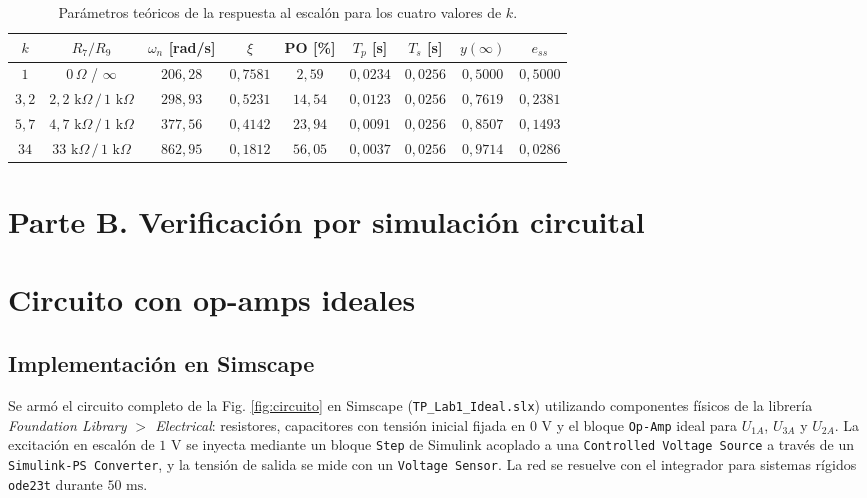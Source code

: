 \documentclass[11pt,a4paper]{article}
\begin{document}
\begin{table}[H]
    \centering
    \begin{tabular}{c c c c c c c c c}
        \toprule
        \textbf{$k$} & \textbf{$R_7 / R_9$} & \textbf{$\omega_n$ [rad/s]} & \textbf{$\xi$} & \textbf{PO [\%]} & \textbf{$T_p$ [s]} & \textbf{$T_s$ [s]} & \textbf{$y(\infty)$} & \textbf{$e_{ss}$} \\
        \midrule
        $1$ & $0\,\Omega$ / $\infty$ & $206,28$ & $0,7581$ & $2,59$ & $0,0234$ & $0,0256$ & $0,5000$ & $0,5000$ \\
        $3,2$ & $2,2\text{ k}\Omega\,/\,1\text{ k}\Omega$ & $298,93$ & $0,5231$ & $14,54$ & $0,0123$ & $0,0256$ & $0,7619$ & $0,2381$ \\
        $5,7$ & $4,7\text{ k}\Omega\,/\,1\text{ k}\Omega$ & $377,56$ & $0,4142$ & $23,94$ & $0,0091$ & $0,0256$ & $0,8507$ & $0,1493$ \\
        $34$ & $33\text{ k}\Omega\,/\,1\text{ k}\Omega$ & $862,95$ & $0,1812$ & $56,05$ & $0,0037$ & $0,0256$ & $0,9714$ & $0,0286$ \\
        \bottomrule
    \end{tabular}
    \caption{Parámetros teóricos de la respuesta al escalón para los cuatro valores de $k$.}
    \label{tab:punto4}
\end{table}

\section*{Parte B. Verificación por simulación circuital}

\section{Circuito con op-amps ideales}

\subsection{Implementación en Simscape}
Se armó el circuito completo de la Fig. \ref{fig:circuito} en Simscape (\texttt{TP\_Lab1\_Ideal.slx}) utilizando componentes físicos de la librería \textit{Foundation Library $>$ Electrical}: resistores, capacitores con tensión inicial fijada en $0\text{ V}$ y el bloque \texttt{Op-Amp} ideal para $U_{1A}$, $U_{3A}$ y $U_{2A}$. La excitación en escalón de $1\text{ V}$ se inyecta mediante un bloque \texttt{Step} de Simulink acoplado a una \texttt{Controlled Voltage Source} a través de un \texttt{Simulink-PS Converter}, y la tensión de salida se mide con un \texttt{Voltage Sensor}. La red se resuelve con el integrador para sistemas rígidos \texttt{ode23t} durante $50\text{ ms}$.
\end{document}
